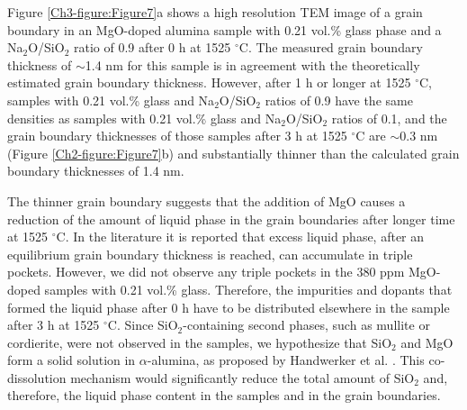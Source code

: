 Figure \ref{Ch3-figure:Figure7}a shows a high resolution TEM image of a grain boundary in an MgO-doped alumina sample with 0.21 vol.\% glass phase and a Na$_{2}$O/SiO$_{2}$ ratio of 0.9 after 0 h at 1525 $^{\circ}$C. The measured grain boundary thickness of $\sim$1.4 nm for this sample is in agreement with the theoretically estimated \cite{Frueh2016} grain boundary thickness. However, after 1 h or longer at 1525 $^{\circ}$C, samples with 0.21 vol.\% glass and Na$_{2}$O/SiO$_{2}$ ratios of 0.9 have the same densities as samples with 0.21 vol.\% glass and Na$_{2}$O/SiO$_{2}$ ratios of 0.1, and the grain boundary thicknesses of those samples after 3 h at 1525 $^{\circ}$C are $\sim$0.3 nm (Figure \ref{Ch2-figure:Figure7}b) and substantially thinner than the calculated grain boundary thicknesses of 1.4 nm.

The thinner grain boundary suggests that the addition of MgO causes a reduction of the amount of liquid phase in the grain boundaries after longer time at 1525 $^{\circ}$C. In the literature it is reported that excess liquid phase, after an equilibrium grain boundary thickness \cite{Subramaniam2006} is reached, can accumulate in triple pockets. However, we did not observe any triple pockets in the 380 ppm MgO-doped samples with 0.21 vol.\% glass. Therefore, the impurities and dopants that formed the liquid phase after 0 h have to be distributed elsewhere in the sample after 3 h at 1525 $^{\circ}$C. Since SiO$_{2}$-containing second phases, such as mullite or cordierite, were not observed in the samples, we hypothesize that SiO$_{2}$ and MgO form a solid solution in $\alpha$-alumina, as proposed by Handwerker et al. \cite{Handwerker1989}. This co-dissolution mechanism would significantly reduce the total amount of SiO$_{2}$ and, therefore, the liquid phase content in the samples and in the grain boundaries. 

